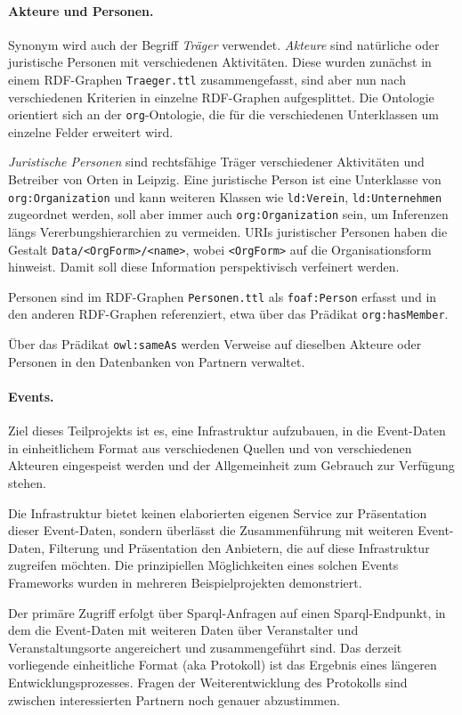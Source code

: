\documentclass[a4paper,11pt]{article}
\begin{document}
\paragraph{Akteure und Personen.} 
Synonym wird auch der Begriff \emph{Träger} verwendet. \emph{Akteure} sind
natürliche oder juristische Personen mit verschiedenen Aktivitäten. Diese
wurden zunächst in einem RDF-Graphen \texttt{Traeger.ttl} zusammengefasst,
sind aber nun nach verschiedenen Kriterien in einzelne RDF-Graphen
aufgesplittet.  Die Ontologie orientiert sich an der \texttt{org}-Ontologie,
die für die verschiedenen Unterklassen um einzelne Felder erweitert wird.

\emph{Juristische Personen} sind rechtsfähige Träger verschiedener Aktivitäten
und Betreiber von Orten in Leipzig. Eine juristische Person ist eine
Unterklasse von \texttt{org:Organization} und kann weiteren Klassen wie
\texttt{ld:Verein}, \texttt{ld:Unternehmen} zugeordnet werden, soll aber immer
auch \texttt{org:Organization} sein, um Inferenzen längs Vererbungshierarchien
zu vermeiden. URIs juristischer Personen haben die Gestalt
\texttt{Data/<OrgForm>/<name>}, wobei \texttt{<OrgForm>} auf die
Organisationsform hinweist. Damit soll diese Information perspektivisch
verfeinert werden.

Personen sind im RDF-Graphen \texttt{Personen.ttl} als \texttt{foaf:Person}
erfasst und in den anderen RDF-Graphen referenziert, etwa über das Prädikat
\texttt{org:hasMember}.

Über das Prädikat \texttt{owl:sameAs} werden Verweise auf dieselben Akteure
oder Personen in den Datenbanken von Partnern verwaltet. 

\paragraph{Events.}
Ziel dieses Teilprojekts ist es, eine Infrastruktur aufzubauen, in die
Event-Daten in einheitlichem Format aus verschiedenen Quellen und von
verschiedenen Akteuren eingespeist werden und der Allgemeinheit zum Gebrauch
zur Verfügung stehen.

Die Infrastruktur bietet keinen elaborierten eigenen Service zur Präsentation
dieser Event-Daten, sondern überlässt die Zusammenführung mit weiteren
Event-Daten, Filterung und Präsentation den Anbietern, die auf diese
Infrastruktur zugreifen möchten. Die prinzipiellen Möglichkeiten eines solchen
Events Frameworks wurden in mehreren Beispielprojekten demonstriert. 

Der primäre Zugriff erfolgt über Sparql-Anfragen auf einen Sparql-Endpunkt, in
dem die Event-Daten mit weiteren Daten über Veranstalter und
Veranstaltungsorte angereichert und zusammengeführt sind.  Das derzeit
vorliegende einheitliche Format (aka Protokoll) ist das Ergebnis eines
längeren Entwicklungsprozesses. Fragen der Weiterentwicklung des Protokolls
sind zwischen interessierten Partnern noch genauer abzustimmen.
\end{document}
